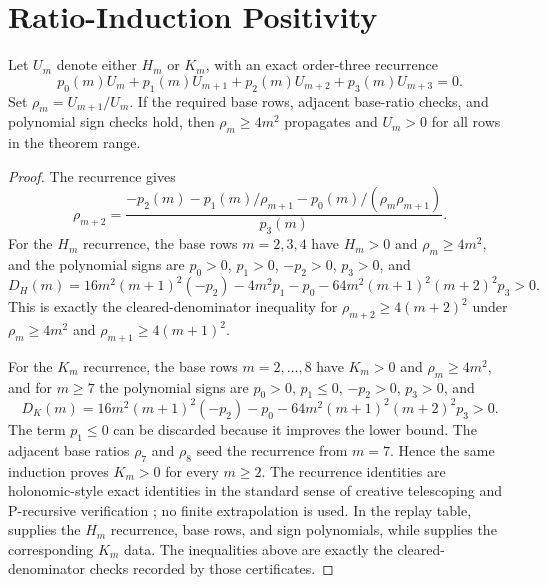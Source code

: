 \section{Ratio-Induction Positivity}\label{sec:positivity}

\begin{lemma}\label{lem:positivity}
Let $U_m$ denote either $H_m$ or $K_m$, with an exact order-three recurrence
\[
  p_0(m)U_m+p_1(m)U_{m+1}+p_2(m)U_{m+2}+p_3(m)U_{m+3}=0.
\]
Set $\rho_m=U_{m+1}/U_m$.  If the required base rows, adjacent base-ratio checks, and polynomial sign checks hold, then $\rho_m\ge4m^2$ propagates and $U_m>0$ for all rows in the theorem range.
\end{lemma}

\begin{proof}
The recurrence gives
\[
\rho_{m+2}=\frac{-p_2(m)-p_1(m)/\rho_{m+1}-p_0(m)/(\rho_m\rho_{m+1})}{p_3(m)}.
\]
For the $H_m$ recurrence, the base rows $m=2,3,4$ have $H_m>0$ and $\rho_m\ge4m^2$, and the polynomial signs are
$p_0>0$, $p_1>0$, $-p_2>0$, $p_3>0$, and
\[
D_H(m)=16m^2(m+1)^2(-p_2)-4m^2p_1-p_0-64m^2(m+1)^2(m+2)^2p_3>0.
\]
This is exactly the cleared-denominator inequality for $\rho_{m+2}\ge4(m+2)^2$ under
$\rho_m\ge4m^2$ and $\rho_{m+1}\ge4(m+1)^2$.

For the $K_m$ recurrence, the base rows $m=2,\ldots,8$ have $K_m>0$ and $\rho_m\ge4m^2$, and for $m\ge7$ the polynomial signs are
$p_0>0$, $p_1\le0$, $-p_2>0$, $p_3>0$, and
\[
D_K(m)=16m^2(m+1)^2(-p_2)-p_0-64m^2(m+1)^2(m+2)^2p_3>0.
\]
The term $p_1\le0$ can be discarded because it improves the lower bound.  The adjacent base ratios $\rho_7$ and
$\rho_8$ seed the recurrence from $m=7$.  Hence the same induction proves $K_m>0$ for every $m\ge2$.
The recurrence identities are holonomic-style exact identities in the standard sense of creative telescoping and
P-recursive verification \cite{Zeilberger1990,PWZ1996}; no finite extrapolation is used.  In the replay table,
 supplies the $H_m$ recurrence, base rows, and sign polynomials, while
 supplies the corresponding $K_m$ data.  The inequalities above are exactly the
cleared-denominator checks recorded by those certificates.
\end{proof}
